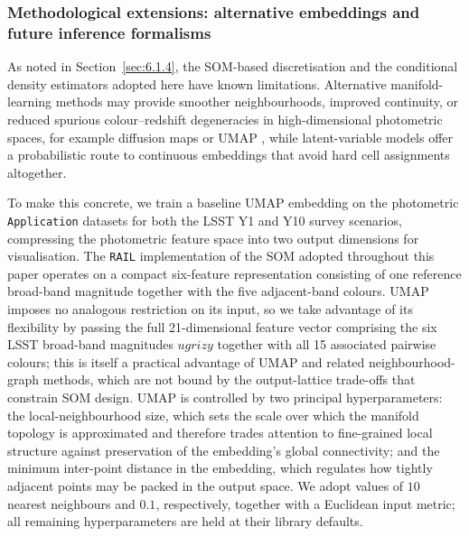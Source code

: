 \subsubsection{Methodological extensions: alternative embeddings and future inference formalisms} \label{sec:6.2.3}

As noted in Section~\ref{sec:6.1.4}, the SOM-based discretisation and the conditional density estimators adopted here have known limitations. Alternative manifold-learning methods may provide smoother neighbourhoods, improved continuity, or reduced spurious colour--redshift degeneracies in high-dimensional photometric spaces, for example diffusion maps \citep{2005math......3445N} or UMAP \citep{2018arXiv180203426M, 2025arXiv251209032A}, while latent-variable models offer a probabilistic route to continuous embeddings that avoid hard cell assignments altogether.

To make this concrete, we train a baseline UMAP embedding on the photometric \texttt{Application} datasets for both the LSST Y1 and Y10 survey scenarios, compressing the photometric feature space into two output dimensions for visualisation. The \texttt{RAIL} implementation of the SOM adopted throughout this paper operates on a compact six-feature representation consisting of one reference broad-band magnitude together with the five adjacent-band colours. UMAP imposes no analogous restriction on its input, so we take advantage of its flexibility by passing the full 21-dimensional feature vector comprising the six LSST broad-band magnitudes \(ugrizy\) together with all 15 associated pairwise colours; this is itself a practical advantage of UMAP and related neighbourhood-graph methods, which are not bound by the output-lattice trade-offs that constrain SOM design. UMAP is controlled by two principal hyperparameters: the local-neighbourhood size, which sets the scale over which the manifold topology is approximated and therefore trades attention to fine-grained local structure against preservation of the embedding's global connectivity; and the minimum inter-point distance in the embedding, which regulates how tightly adjacent points may be packed in the output space. We adopt values of \(10\) nearest neighbours and \(0.1\), respectively, together with a Euclidean input metric; all remaining hyperparameters are held at their library defaults.


